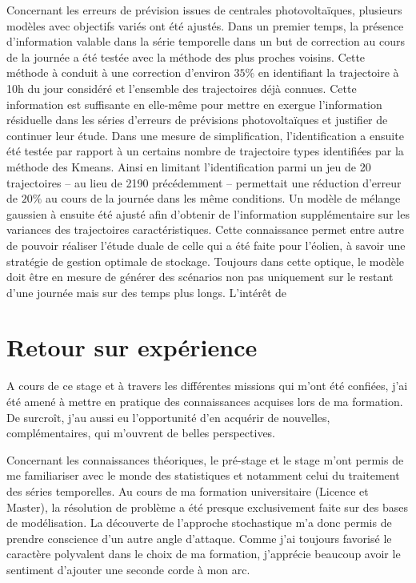 \documentclass[12pt]{report}
\begin{document}
Concernant les erreurs de prévision issues de centrales photovoltaïques, plusieurs modèles avec objectifs variés ont été ajustés. Dans un premier temps, la présence d'information valable dans la série temporelle dans un but de correction au cours de la journée a été testée avec la méthode des plus proches voisins. Cette méthode à conduit à une correction d'environ $35 \%$ en identifiant la trajectoire à 10h du jour considéré et l'ensemble des trajectoires déjà connues. Cette information est suffisante en elle-même pour mettre en exergue l'information résiduelle dans les séries d'erreurs de prévisions photovoltaïques et justifier de continuer leur étude. Dans une mesure de simplification, l'identification a ensuite été testée par rapport à un certains nombre de trajectoire types identifiées par la méthode des Kmeans. Ainsi en limitant l'identification parmi un jeu de 20 trajectoires -- au lieu de 2190 précédemment -- permettait une réduction d'erreur de $20 \%$ au cours de la journée dans les même conditions. Un modèle de mélange gaussien à ensuite été ajusté afin d'obtenir de l'information supplémentaire sur les variances des trajectoires caractéristiques. Cette connaissance permet entre autre de pouvoir réaliser l'étude duale de celle qui a été faite pour l'éolien, à savoir une stratégie de gestion optimale de stockage. Toujours dans cette optique, le modèle doit être en mesure de générer des scénarios non pas uniquement sur le restant d'une journée mais sur des temps plus longs. L'intérêt de 


\chapter{Retour sur expérience}





A cours de ce stage et à travers les différentes missions qui m'ont été confiées, j'ai été amené à mettre en pratique des connaissances acquises lors de ma formation. De surcroît, j'au aussi eu l'opportunité d'en acquérir de nouvelles, complémentaires, qui m'ouvrent de belles perspectives.

Concernant les connaissances théoriques, le pré-stage et le stage m'ont permis de me familiariser avec le monde des statistiques et notamment celui du traitement des séries temporelles. Au cours de ma formation universitaire (Licence et Master), la résolution de problème a été presque exclusivement faite sur des bases de modélisation. La découverte de l'approche stochastique m'a donc permis de prendre conscience d'un autre angle d'attaque. Comme j'ai toujours favorisé le caractère polyvalent dans le choix de ma formation, j'apprécie beaucoup avoir le sentiment d'ajouter une seconde corde à mon arc.
\end{document}
